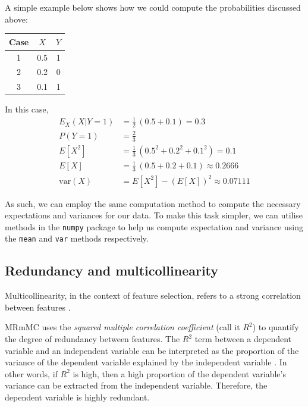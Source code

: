 \documentclass[12pt, twoside, a4paper]{report}
\def\var{\text{var}}
\begin{document}
A simple example below shows how we could compute the probabilities discussed above:

\begin{center}
    \begin{tabular}{| c || c | c |}
    \hline
     Case & $X$ & $Y$ \\ \hline \hline
     1 & 0.5 & 1 \\ \hline
     2 & 0.2 & 0 \\ \hline
     3 & 0.1 & 1 \\ \hline
    \end{tabular}
\end{center}

In this case,
\begin{align*}
E_X(X|Y=1) &= \frac{1}{2} \,  (0.5+0.1) = 0.3 \\
P(Y=1) &= \frac{2}{3} \\
E[X^2] &= \frac{1}{3} \, (0.5^2+0.2^2+0.1^2) = 0.1 \\
E[X] &= \frac{1}{3} \, (0.5+0.2+0.1) \approx 0.2666 \\
\var(X) &= E[X^2] - (E[X])^2 \approx 0.07111
\end{align*}

As such, we can employ the same computation method to compute the necessary expectations and variances for our data. To make this task simpler, we can utilise methods in the \texttt{numpy} \cite{RefWorks:214} package to help us compute expectation and variance using the \texttt{mean} and \texttt{var} methods respectively.

\subsection{Redundancy and multicollinearity}

Multicollinearity, in the context of feature selection, refers to a strong correlation between features \cite{RefWorks:234}.

MRmMC uses the \textit{squared multiple correlation coefficient} (call it $R^2$) to quantify the degree of redundancy between features. The $R^2$ term between a dependent variable and an independent variable can be interpreted as the proportion of the variance of the dependent variable explained by the independent variable \cite{RefWorks:193}. In other words, if $R^2$ is high, then a high proportion of the dependent variable's variance can be extracted from the independent variable. Therefore, the dependent variable is highly redundant.
\end{document}
